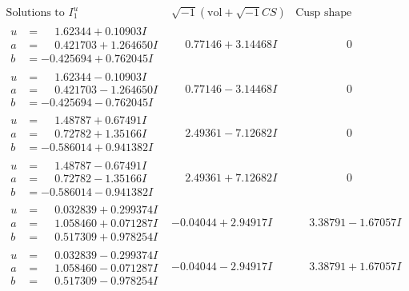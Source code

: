 \documentclass[1p]{elsarticle_modified}
\theoremstyle{definition}
\newcommand{\I}{\sqrt{-1}}
\begin{document}
$$\begin{array}{c|c|c}
\text{Solutions to }I^u_{1}& \I (\text{vol} + \sqrt{-1}CS) & \text{Cusp shape}\\
 \hline 
\begin{aligned}
u &= \phantom{-}1.62344 + 0.10903 I \\
a &= \phantom{-}0.421703 + 1.264650 I \\
b &= -0.425694 + 0.762045 I\end{aligned}
 & \phantom{-}0.77146 + 3.14468 I & \phantom{-0.000000 } 0 \\ \hline\begin{aligned}
u &= \phantom{-}1.62344 - 0.10903 I \\
a &= \phantom{-}0.421703 - 1.264650 I \\
b &= -0.425694 - 0.762045 I\end{aligned}
 & \phantom{-}0.77146 - 3.14468 I & \phantom{-0.000000 } 0 \\ \hline\begin{aligned}
u &= \phantom{-}1.48787 + 0.67491 I \\
a &= \phantom{-}0.72782 + 1.35166 I \\
b &= -0.586014 + 0.941382 I\end{aligned}
 & \phantom{-}2.49361 - 7.12682 I & \phantom{-0.000000 } 0 \\ \hline\begin{aligned}
u &= \phantom{-}1.48787 - 0.67491 I \\
a &= \phantom{-}0.72782 - 1.35166 I \\
b &= -0.586014 - 0.941382 I\end{aligned}
 & \phantom{-}2.49361 + 7.12682 I & \phantom{-0.000000 } 0 \\ \hline\begin{aligned}
u &= \phantom{-}0.032839 + 0.299374 I \\
a &= \phantom{-}1.058460 + 0.071287 I \\
b &= \phantom{-}0.517309 + 0.978254 I\end{aligned}
 & -0.04044 + 2.94917 I & \phantom{-}3.38791 - 1.67057 I \\ \hline\begin{aligned}
u &= \phantom{-}0.032839 - 0.299374 I \\
a &= \phantom{-}1.058460 - 0.071287 I \\
b &= \phantom{-}0.517309 - 0.978254 I\end{aligned}
 & -0.04044 - 2.94917 I & \phantom{-}3.38791 + 1.67057 I \\ \hline\begin{aligned}

\end{aligned}
\end{array}$$
\end{document}

